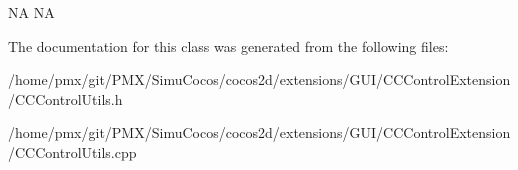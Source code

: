 NA  NA 

The documentation for this class was generated from the following files\+:\begin{DoxyCompactItemize}
\item 
/home/pmx/git/\+P\+M\+X/\+Simu\+Cocos/cocos2d/extensions/\+G\+U\+I/\+C\+C\+Control\+Extension/C\+C\+Control\+Utils.\+h\item 
/home/pmx/git/\+P\+M\+X/\+Simu\+Cocos/cocos2d/extensions/\+G\+U\+I/\+C\+C\+Control\+Extension/C\+C\+Control\+Utils.\+cpp\end{DoxyCompactItemize}
